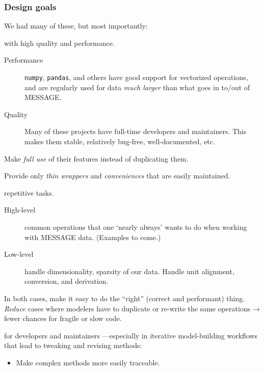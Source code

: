 \documentclass[12pt,aspectratio=169]{beamer}
\renewcommand{\mod}[1]{\texttt{#1}}
\begin{document}
\begin{frame}[allowframebreaks]
\frametitle{Design goals}
We had many of these, but most importantly:

\bigskip
{} with high quality and performance.

\begin{description}
  \item [Performance] \mod{numpy}, \mod{pandas}, and others have good support for vectorized operations,
    and are regularly used for data \emph{much larger} than what goes in to/out of MESSAGE.
  \item [Quality] Many of these projects have full-time developers and maintainers.
    This makes them stable, relatively bug-free, well-documented, etc.
\end{description}

\medskip
Make \emph{full use} of their features instead of duplicating them.

\medskip
Provide only \emph{thin wrappers} and \emph{conveniences} that are easily maintained.

\framebreak
{} repetitive tasks.

\begin{description}
  \item [High-level] common operations that one ‘nearly always' wants to do
    when working with MESSAGE data. (Examples to come.)
  \item [Low-level] handle dimensionality, sparsity of our data.
    Handle unit alignment, conversion, and derivation.
\end{description}

In both cases, make it easy to do the “right” (correct and performant) thing.
\emph{Reduce} cases where modelers have to duplicate or re-write the same operations →
fewer chances for fragile or slow code.

\medskip

 for developers and maintainers%
—especially in iterative model-building workflows that lead to tweaking and revising methods:
\begin{itemize}
  \item Make complex methods more easily traceable.
\end{itemize}
\end{frame}
\end{document}

